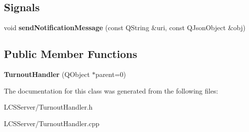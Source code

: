 \subsection*{Signals}
\begin{DoxyCompactItemize}
\item 
\mbox{\label{class_turnout_handler_a5c0222680069e799ba813bbe1f65af50}} 
void {\bfseries send\+Notification\+Message} (const Q\+String \&uri, const Q\+Json\+Object \&obj)
\end{DoxyCompactItemize}
\subsection*{Public Member Functions}
\begin{DoxyCompactItemize}
\item 
\mbox{\label{class_turnout_handler_a1606b58bfcdae2d43f5667a7f5623a1b}} 
{\bfseries Turnout\+Handler} (Q\+Object $\ast$parent=0)
\end{DoxyCompactItemize}


The documentation for this class was generated from the following files\+:\begin{DoxyCompactItemize}
\item 
L\+C\+S\+Server/Turnout\+Handler.\+h\item 
L\+C\+S\+Server/Turnout\+Handler.\+cpp\end{DoxyCompactItemize}
